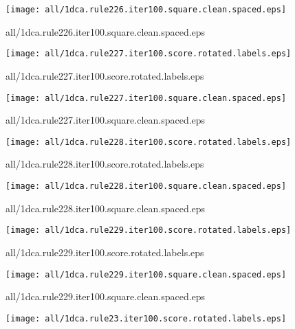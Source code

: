 \documentclass{article}
\begin{document}
\begin{center}
\begin{minipage}{\textwidth}
\texttt{[image: all/1dca.rule226.iter100.square.clean.spaced.eps]}
\end{minipage}
\end{center}
{\footnotesize all/1dca.rule226.iter100.square.clean.spaced.eps}
\begin{center}
\begin{minipage}{\textwidth}
\texttt{[image: all/1dca.rule227.iter100.score.rotated.labels.eps]}
\end{minipage}
\end{center}
{\footnotesize all/1dca.rule227.iter100.score.rotated.labels.eps}
\begin{center}
\begin{minipage}{\textwidth}
\texttt{[image: all/1dca.rule227.iter100.square.clean.spaced.eps]}
\end{minipage}
\end{center}
{\footnotesize all/1dca.rule227.iter100.square.clean.spaced.eps}
\begin{center}
\begin{minipage}{\textwidth}
\texttt{[image: all/1dca.rule228.iter100.score.rotated.labels.eps]}
\end{minipage}
\end{center}
{\footnotesize all/1dca.rule228.iter100.score.rotated.labels.eps}
\begin{center}
\begin{minipage}{\textwidth}
\texttt{[image: all/1dca.rule228.iter100.square.clean.spaced.eps]}
\end{minipage}
\end{center}
{\footnotesize all/1dca.rule228.iter100.square.clean.spaced.eps}
\begin{center}
\begin{minipage}{\textwidth}
\texttt{[image: all/1dca.rule229.iter100.score.rotated.labels.eps]}
\end{minipage}
\end{center}
{\footnotesize all/1dca.rule229.iter100.score.rotated.labels.eps}
\begin{center}
\begin{minipage}{\textwidth}
\texttt{[image: all/1dca.rule229.iter100.square.clean.spaced.eps]}
\end{minipage}
\end{center}
{\footnotesize all/1dca.rule229.iter100.square.clean.spaced.eps}
\begin{center}
\begin{minipage}{\textwidth}
\texttt{[image: all/1dca.rule23.iter100.score.rotated.labels.eps]}
\end{minipage}
\end{center}
\end{document}
